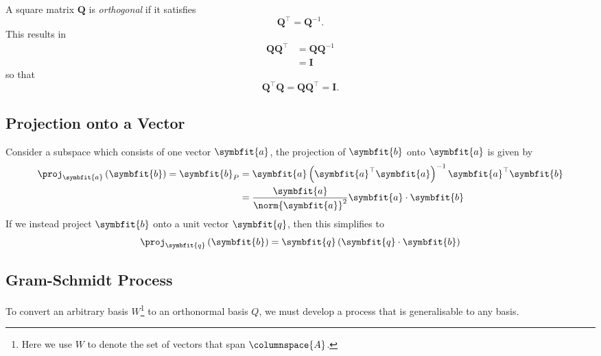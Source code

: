 \documentclass{article}
\begin{document}
\begin{definition}
    A square matrix \(\symbf{Q}\) is \textit{orthogonal} if it satisfies
    \begin{equation*}
        \symbf{Q}^\top = \symbf{Q}^{-1}.
    \end{equation*}
    This results in
    \begin{align*}
        \symbf{Q}\symbf{Q}^\top & = \symbf{Q}\symbf{Q}^{-1} \\
                                & =\symbf{I}
    \end{align*}
    so that
    \begin{equation*}
        \symbf{Q}^\top \symbf{Q} = \symbf{Q}\symbf{Q}^\top = \symbf{I}.
    \end{equation*}
\end{definition}
\subsection{Projection onto a Vector}
Consider a subspace which consists of one vector \(\symbfit{a}\), the projection of \(\symbfit{b}\)
onto \(\symbfit{a}\) is given by
\begin{align*}
    \proj_{\symbfit{a}} \left( \symbfit{b} \right) = \symbfit{b}_P & = \symbfit{a} \left( \symbfit{a}^\top \symbfit{a} \right)^{-1} \symbfit{a}^\top \symbfit{b} \\
                                                                   & = \frac{\symbfit{a}}{\norm{\symbfit{a}}^2} \symbfit{a} \cdot \symbfit{b}
\end{align*}
If we instead project \(\symbfit{b}\) onto a unit vector \(\symbfit{q}\), then this simplifies to
\begin{equation*}
    \proj_{\symbfit{q}} \left( \symbfit{b} \right) = \symbfit{q} \left( \symbfit{q} \cdot \symbfit{b} \right)
\end{equation*}
\subsection{Gram-Schmidt Process}
To convert an arbitrary basis \(W\)\footnote{Here we use \(W\) to denote the set of vectors that span \(\columnspace{A}\).} to an orthonormal basis \(Q\), we
must develop a process that is generalisable to any basis.
\end{document}
